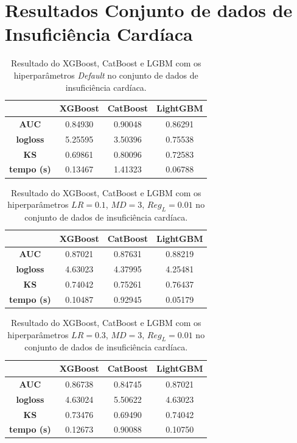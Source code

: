 \section{Resultados Conjunto de dados de Insuficiência Cardíaca}
\begin{table}[H]
\centering
\begin{tabular}{|c|c|c|c|}
\hline
	& \textbf{XGBoost} &\textbf{CatBoost} & \textbf{LightGBM} \\
\hline
\textbf{AUC}	& 0.84930&	0.90048&	0.86291\\
\hline
\textbf{logloss}	& 5.25595&	3.50396	&0.75538\\
\hline
\textbf{KS}	&0.69861	&0.80096	&0.72583\\
\hline
\textbf{tempo (s)}	& 0.13467	&1.41323	&0.06788 \\
\hline
\end{tabular}
\caption{Resultado do XGBoost, CatBoost e LGBM com os hiperparâmetros \textit{Default} no conjunto de dados de insuficiência cardíaca.}\label{res:car:1}
\end{table}

\begin{table}[H]
\label{res:car:2}
\centering
\begin{tabular}{|c|c|c|c|}
\hline
	& \textbf{XGBoost} &\textbf{CatBoost} & \textbf{LightGBM} \\
\hline
\textbf{AUC}	& 0.87021&	0.87631	&0.88219\\
\hline
\textbf{logloss}	& 4.63023&	4.37995&	4.25481\\
\hline
\textbf{KS}	&0.74042	&0.75261&	0.76437\\
\hline
\textbf{tempo (s)}	& 0.10487	&0.92945	&0.05179 \\
\hline
\end{tabular}
\caption{Resultado do XGBoost, CatBoost e LGBM com os hiperparâmetros $LR=0.1$, $MD=3$, $Reg_L=0.01$ no conjunto de dados de insuficiência cardíaca.}
\end{table}

\begin{table}[H]
\label{res:car:3}
\centering
\begin{tabular}{|c|c|c|c|}
\hline
	& \textbf{XGBoost} &\textbf{CatBoost} & \textbf{LightGBM} \\
\hline
\textbf{AUC}	& 0.86738	&0.84745	&0.87021\\
\hline
\textbf{logloss}	& 4.63024&	5.50622	&4.63023\\
\hline
\textbf{KS}	&0.73476	&0.69490	&0.74042\\
\hline
\textbf{tempo (s)}	& 0.12673	&0.90088	&0.10750 \\
\hline
\end{tabular}
\caption{Resultado do XGBoost, CatBoost e LGBM com os hiperparâmetros $LR=0.3$, $MD=3$, $Reg_L=0.01$ no conjunto de dados de insuficiência cardíaca.}
\end{table}

